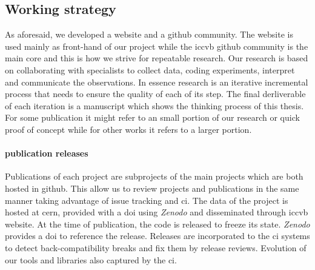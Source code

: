\subsection{Working strategy}
As aforesaid, we developed a website and a github community.
The website is used mainly as front-hand of our project while the \ac{iccvb} github community is the main core and this is how we strive for repeatable research.
Our research is based on collaborating with specialists to collect data, coding experiments, interpret and communicate the observations.
In essence research is an iterative incremental process that needs to ensure the quality of each of its step. 
The final derliverable of each iteration is a manuscript which shows the thinking process of this thesis.
For some publication it might refer to an small portion of our research or quick proof of concept while for other works it refers to a larger portion.


\paragraph{publication releases}

Publications of each project are subprojects of the main projects which are both hosted in github.
This allow us to review projects and publications in the same manner taking advantage of issue tracking and \acs{ci}.
The data of the project is hosted at \acs{cern}, provided with a \acs{doi} using \emph{Zenodo} and disseminated through \acs{iccvb} website.
At the time of publication, the code is released to freeze its state. 
\emph{Zenodo} provides a \acs{doi} to reference the release. Releases are incorporated to the \acs{ci} systems to detect back-compatibility breaks and fix them by release reviews.
Evolution of our tools and libraries also captured by the \acs{ci}.

